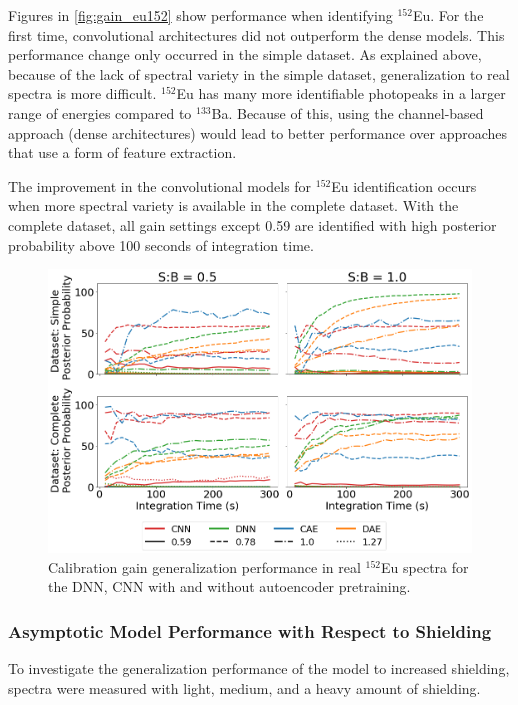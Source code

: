 Figures in \ref{fig:gain_eu152} show performance when identifying $^{152}$Eu. For the first time, convolutional architectures did not outperform the dense models. This performance change only occurred in the simple dataset. As explained above, because of the lack of spectral variety in the simple dataset, generalization to real spectra is more difficult. $^{152}$Eu has many more identifiable photopeaks in a larger range of energies compared to $^{133}$Ba. Because of this, using the channel-based approach (dense architectures) would lead to better performance over approaches that use a form of feature extraction.

The improvement in the convolutional models for $^{152}$Eu identification occurs when more spectral variety is available in the complete dataset. With the complete dataset, all gain settings except 0.59 are identified with high posterior probability above 100 seconds of integration time. 


\begin{figure}[H]
	\centering
	\includegraphics[width=1.0\linewidth]{images/realspectra-cal-eu152}
	\caption{Calibration gain generalization performance in real $^{152}$Eu spectra for the DNN, CNN with and without autoencoder pretraining.}
	\label{fig:realspectra-cal-eu152}
\end{figure}

\subsubsection{Asymptotic Model Performance with Respect to Shielding}

To investigate the generalization performance of the model to increased shielding, spectra were measured with light, medium, and a heavy amount of shielding. 

